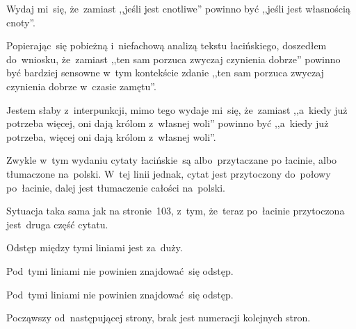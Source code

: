 \documentclass[a4paper,11pt]{article}
\begin{document}
\vspace{\spaceFour}


\start {} Wydaj mi~się, że~zamiast ,,jeśli jest cnotliwe''
powinno być ,,jeśli jest własnością cnoty''.

\vspace{\spaceFour}


\start {} Popierając~się pobieżną i~niefachową analizą
tekstu łacińskiego, doszedłem do~wniosku, że~zamiast ,,ten sam porzuca
zwyczaj czynienia dobrze'' powinno być bardziej sensowne w~tym
kontekście zdanie ,,ten sam porzuca zwyczaj czynienia dobrze w~czasie
zamętu''.

\vspace{\spaceFour}


\start {} Jestem słaby z~interpunkcji, mimo tego wydaje
mi~się, że~zamiast ,,a~kiedy już potrzeba więcej, oni dają królom
z~własnej woli'' powinno być ,,a~kiedy już potrzeba, więcej oni dają
królom z~własnej woli''.

\vspace{\spaceFour}


\start {} Zwykle w~tym wydaniu cytaty łacińskie~są
albo~przytaczane po łacinie, albo tłumaczone na~polski. W~tej linii
jednak, cytat jest przytoczony do~połowy po~łacinie, dalej jest
tłumaczenie całości na~polski.

\vspace{\spaceFour}


\start {} Sytuacja taka sama jak na stronie~103, z~tym,
że~teraz po~łacinie przytoczona jest~druga część cytatu.

\vspace{\spaceFour}


\start {} Odstęp między tymi
liniami jest za~duży.

\vspace{\spaceFour}


\start {} Pod~tymi liniami nie powinien
znajdować~się odstęp.

\vspace{\spaceFour}


\start {} Pod~tymi liniami nie powinien
znajdować~się odstęp.

\vspace{\spaceFour}


\start {} Począwszy od~następującej strony, brak jest numeracji
kolejnych stron.

\vspace{\spaceFour}
\end{document}
